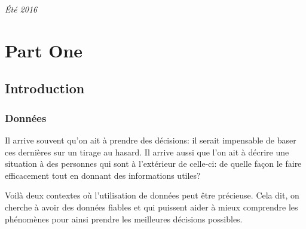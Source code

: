 \documentclass[11pt,fleqn]{book} %
\begin{document}
\noindent \textit{Été 2016} %




\pagestyle{empty} %

\tableofcontents %

\cleardoublepage %

\pagestyle{fancy} %


\part{Part One}



\chapter{Introduction}

\section{Données}
Il arrive souvent qu'on ait à prendre des décisions: il serait impensable de baser ces dernières sur un tirage au hasard. Il arrive aussi que l'on ait à décrire une situation à des personnes qui sont à l'extérieur de celle-ci: de quelle façon le faire efficacement tout en donnant des informations utiles?

Voilà deux contextes où l'utilisation de données peut être précieuse. Cela dit, on cherche à avoir des données fiables et qui puissent aider à mieux comprendre les phénomènes pour ainsi prendre les meilleures décisions possibles.
\end{document}
